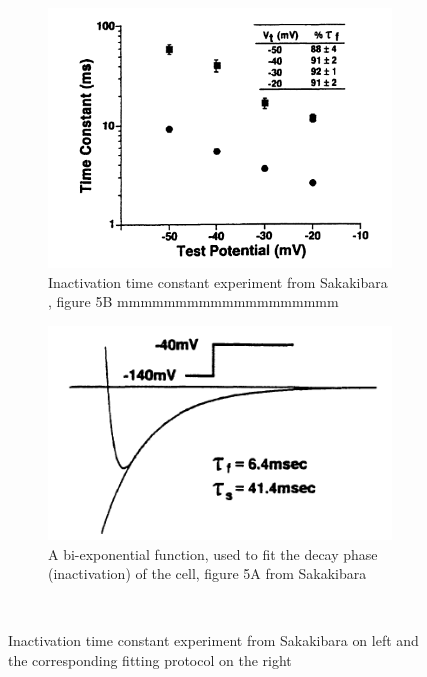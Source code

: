 \documentclass[11pt]{report}
\begin{document}
\begin{figure}[H]
    \centering
    \captionsetup{singlelinecheck = false, format= hang, justification=raggedright, font=footnotesize, labelsep=space}
    \begin{subfigure}[b]{0.49\textwidth}
    \centering
        \includegraphics[width=\linewidth]{figures/SakakibaraFigure5B.PNG}
        \caption{Inactivation time constant experiment from Sakakibara \cite{Sakakibara1992}, figure 5B {\color{white} mmmmmmmmmmmmmmmmmmm }}
    \end{subfigure}
    \begin{subfigure}[b]{0.49\textwidth}
    \centering
        \includegraphics[width=\linewidth]{figures/InactKinSaka.png}
        \caption{A bi-exponential function, used to fit the decay phase (inactivation) of the cell, figure 5A from Sakakibara \cite{Sakakibara1992}}
    \end{subfigure}

    ~
    \caption{Inactivation time constant experiment from Sakakibara \cite{Sakakibara1992} on left and the corresponding fitting protocol on the right}
    \label{fig:InactKinetics}
\end{figure}
\end{document}
